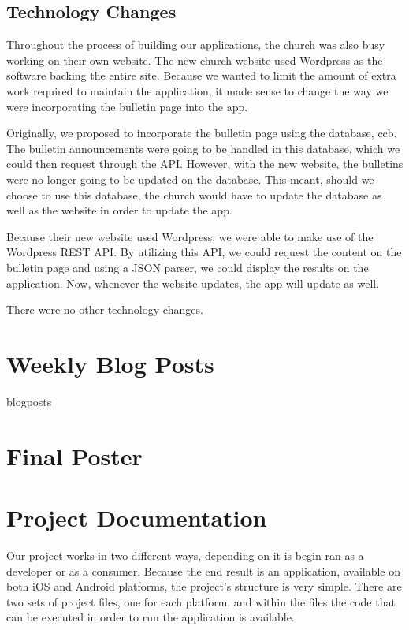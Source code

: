 \documentclass[letterpaper,10pt,draftclsnofoot,onecolumn,titlepage]{IEEEtran}
\begin{document}
	\subsection{Technology Changes}
	Throughout the process of building our applications, the church was also busy working on their own website.
	The new church website used Wordpress as the software backing the entire site.
	Because we wanted to limit the amount of extra work required to maintain the application, it made sense to change the way we were incorporating the bulletin page into the app.

	Originally, we proposed to incorporate the bulletin page using the database, \gls{ccb}.
	The bulletin announcements were going to be handled in this database, which we could then request through the API.
	However, with the new website, the bulletins were no longer going to be updated on the database.
	This meant, should we choose to use this database, the church would have to update the database as well as the website in order to update the app.

	Because their new website used Wordpress, we were able to make use of the Wordpress REST API.
	By utilizing this API, we could request the content on the bulletin page and using a JSON parser, we could display the results on the application.
	Now, whenever the website updates, the app will update as well.

	There were no other technology changes.

\section{Weekly Blog Posts}

	{blogposts}

\section{Final Poster}



\section{Project Documentation}

Our project works in two different ways, depending on it is begin ran as a developer or as a consumer.
Because the end result is an application, available on both iOS and Android platforms, the project's structure is very simple.
There are two sets of project files, one for each platform, and within the files the code that can be executed in order to run the application is available.
\end{document}
